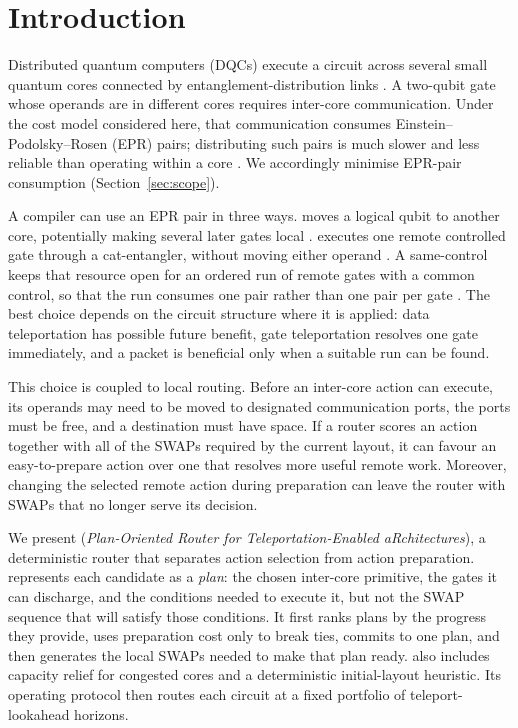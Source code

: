 \section{Introduction}
\label{sec:intro}

Distributed quantum computers (DQCs) execute a circuit across several
small quantum cores connected by entanglement-distribution links
\cite{cuomo2020towards,escofet2025review,ang2024arquin}. A two-qubit gate whose operands
are in different cores requires inter-core communication. Under the cost
model considered here, that communication consumes
Einstein--Podolsky--Rosen (EPR) pairs; distributing such pairs is much
slower and less reliable than operating within a core
\cite{stephenson2020high,daiss2021quantum}. We accordingly minimise
EPR-pair consumption (Section~\ref{sec:scope}).

A compiler can use an EPR pair in three ways. \TeleData{} moves a logical
qubit to another core, potentially making several later gates local
\cite{bennett1993teleporting}. \TeleGate{} executes one remote controlled
gate through a cat-entangler, without moving either operand
\cite{eisert2000optimal,yimsiriwattana2004generalized}. A same-control
\TeleGatePacket{} keeps that resource open for an ordered run
of remote gates with a common control, so that the run consumes one pair
rather than one pair per gate \cite{wu2022autocomm}. The best choice depends
on the circuit structure where it is applied: data teleportation has
possible future benefit, gate teleportation resolves one gate immediately,
and a packet is beneficial only when a suitable run can be found.

This choice is coupled to local routing. Before an inter-core action can
execute, its operands may need to be moved to designated communication
ports, the ports must be free, and a \TeleData{} destination must have
space. If a router scores an action together with all of the SWAPs required
by the current layout, it can favour an easy-to-prepare action over one
that resolves more useful remote work. Moreover, changing the selected
remote action during preparation can leave the router with SWAPs that no
longer serve its decision.

We present \PORTER{} (\emph{Plan-Oriented Router for Teleportation-Enabled
aRchitectures}), a deterministic router that separates action selection
from action preparation. \PORTER{} represents each candidate as a
\emph{plan}: the chosen inter-core primitive, the gates it can discharge,
and the conditions needed to execute it, but not the SWAP sequence that
will satisfy those conditions. It first ranks plans by the progress they
provide, uses preparation cost only to break ties, commits to one plan,
and then generates the local SWAPs needed to make that plan ready.
\PORTER{} also includes capacity relief for congested cores and a
deterministic initial-layout heuristic. Its operating protocol then routes each
circuit at a fixed portfolio of teleport-lookahead horizons.

